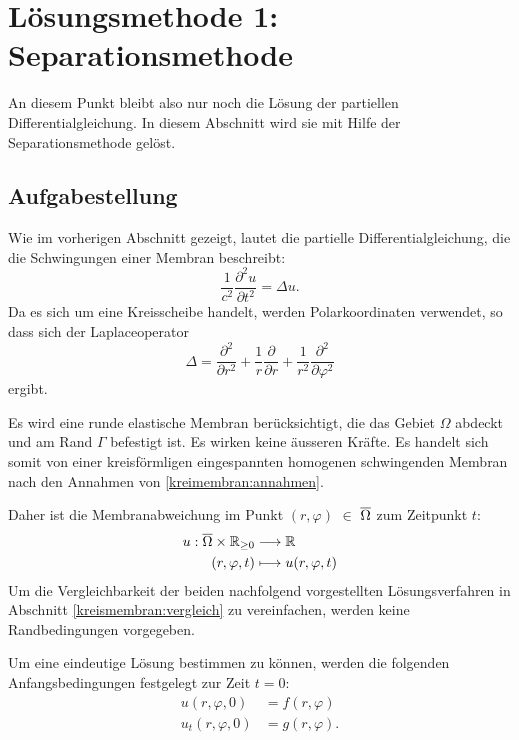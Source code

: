 %
%


\section{Lösungsmethode 1: Separationsmethode 
	\label{kreismembran:section:teil1}}
An diesem Punkt bleibt also nur noch die Lösung der partiellen Differentialgleichung. In diesem Abschnitt wird sie mit Hilfe der Separationsmethode gelöst.

\subsection{Aufgabestellung\label{sub:aufgabestellung}}
Wie im vorherigen Abschnitt gezeigt, lautet die partielle Differentialgleichung, die die Schwingungen einer Membran beschreibt:
\begin{equation*}
	\frac{1}{c^2}\frac{\partial^2u}{\partial t^2} = \Delta u.
\end{equation*}
Da es sich um eine Kreisscheibe handelt, werden Polarkoordinaten verwendet, so dass sich der Laplaceoperator
\begin{equation*}
	\Delta
	=
	\frac{\partial^2}{\partial r^2}
	+
	\frac1r
	\frac{\partial}{\partial r}
	+
	\frac{1}{r^2}
	\frac{\partial^2}{\partial\varphi^2}
	\label{buch:pde:kreis:laplace}
\end{equation*}
ergibt.

Es wird eine runde elastische Membran berücksichtigt, die das Gebiet $\Omega$ abdeckt und am Rand $\Gamma$ befestigt ist.
Es wirken keine äusseren Kräfte. Es handelt sich somit von einer kreisförmligen eingespannten homogenen schwingenden Membran nach den Annahmen von \ref{kreimembran:annahmen}.

Daher ist die Membranabweichung im Punkt $(r,\varphi)$ $\in$ $\overline{\rm \Omega}$ zum Zeitpunkt $t$:
\begin{align*}
	u: \overline{\rm \Omega} \times \mathbb{R}_{\geq 0} &\longrightarrow \mathbb{R}\\
	(r,\varphi,t) &\longmapsto u(r,\varphi,t)
\end{align*}
Um die Vergleichbarkeit der beiden nachfolgend vorgestellten Lösungsverfahren in Abschnitt \ref{kreismembran:vergleich} zu vereinfachen, werden keine Randbedingungen vorgegeben.

Um eine eindeutige Lösung bestimmen zu können, werden die folgenden Anfangsbedingungen festgelegt zur Zeit $t = \text{0}$:
\begin{align*}
	u(r,\varphi, 0) &= f(r,\varphi)\\
	u_t(r,\varphi, 0) &= g(r,\varphi).
\end{align*}

